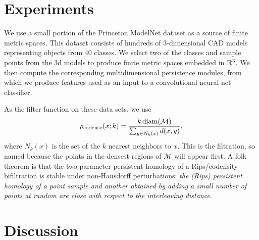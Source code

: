 \documentclass{article}
\begin{document}
\section{Experiments}
We use a small portion of the Princeton ModelNet dataset as a source of finite
metric spaces. This dataset consists of hundreds of 3-dimensional CAD models
representing objects from 40 classes. We select two of the classes and sample
points from the 3d models to produce finite metric spaces embedded in $\mathbb{R}^3$.
We then compute the corresponding multidimensional persistence modules, from
which we produce features used as an input to a convolutional neural net
classifier. 

As the filter function on these data sets, we use
\[\rho_{\text{codense}}(x;k) = \frac{k \operatorname{diam}(\mathcal M)}{\sum_{y \in N_k(x)}
    d(x,y)},\]
where $N_k(x)$ is the set of the $k$ nearest neighbors to $x$. This is the
 filtration, so named because the points in the densest
regions of $\mathcal M$ will appear first. A folk theorem is that the
two-parameter persistent homology of a Rips/codensity bifiltration is stable
under non-Hausdorff perturbations: \textit{the (Rips) persistent homology of a
  point sample and another obtained by adding a small number of points at random
are close with respect to the interleaving distance}.



\section{Discussion}



\end{document}
